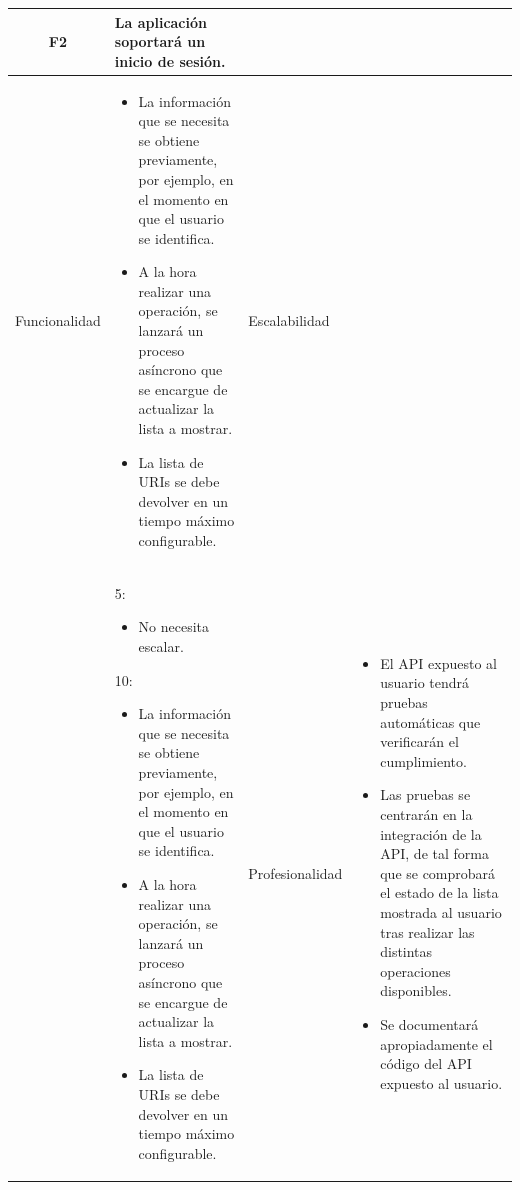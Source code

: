 \documentclass{article}
\begin{document}
\begin{table}[hbtp]
    \footnotesize
    \centering
    \settowidth{}
    \setlength\extrarowheight{5pt}
    \begin{tabulary}{\textwidth}{ C L }
        \textbf{F2} & La aplicación soportará un inicio de sesión.
        \\
    \hline
    
    Funcionalidad &
    \begin{itemize}
        \item La información que se necesita se obtiene previamente, por ejemplo, en el momento en que el usuario se identifica.
        \item A la hora realizar una operación, se lanzará un proceso asíncrono que se encargue de actualizar la lista a mostrar.
        \item La lista de URIs se debe devolver en un tiempo máximo configurable.
    \end{itemize} &
        
    Escalabilidad\\ &
    5:
    \begin{itemize}
        \item No necesita escalar.
        
    \end{itemize} 
    10:
    \begin{itemize}
        \item La información que se necesita se obtiene previamente, por ejemplo, en el momento en que el usuario se identifica.
		
		\item A la hora realizar una operación, se lanzará un proceso asíncrono que se encargue de actualizar la lista a mostrar.

		\item La lista de URIs se debe devolver en un tiempo máximo configurable.
    \end{itemize} &

    Profesionalidad & 
    \begin{itemize}
        \item El API expuesto al usuario tendrá pruebas automáticas que verificarán el cumplimiento.
	    \item Las pruebas se centrarán en la integración de la API, de tal forma que se comprobará el estado de la lista mostrada al usuario tras realizar las distintas operaciones disponibles.
        \item Se documentará apropiadamente el código del API expuesto al usuario.
    \end{itemize}

    \end{tabulary}
\end{table}
\end{document}
